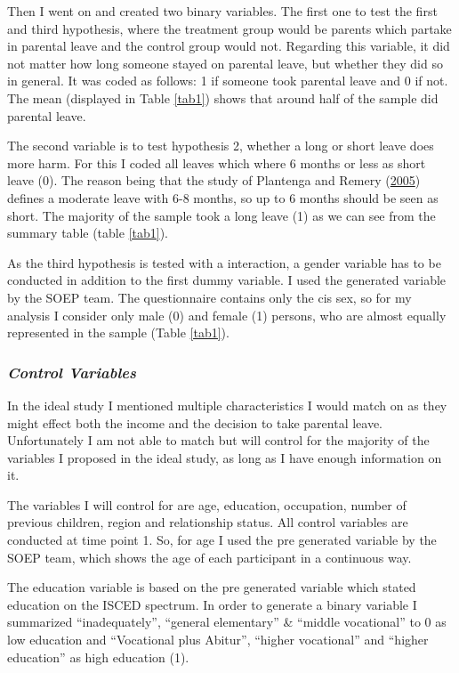 \documentclass[
  12pt,
]{article}
\begin{document}
Then I went on and created two binary variables. The first one to test the first and third hypothesis, where the treatment group would be parents which partake in parental leave and the control group would not. Regarding this variable, it did not matter how long someone stayed on parental leave, but whether they did so in general. It was coded as follows: 1 if someone took parental leave and 0 if not. The mean (displayed in Table \ref{tab1}) shows that around half of the sample did parental leave.

The second variable is to test hypothesis 2, whether a long or short leave does more harm. For this I coded all leaves which where 6 months or less as short leave (0). The reason being that the study of Plantenga and Remery (\protect\hyperlink{ref-plantenga_reconciliation_2005}{2005}) defines a moderate leave with 6-8 months, so up to 6 months should be seen as short. The majority of the sample took a long leave (1) as we can see from the summary table (table \ref{tab1}).

As the third hypothesis is tested with a interaction, a gender variable has to be conducted in addition to the first dummy variable. I used the generated variable by the SOEP team. The questionnaire contains only the cis sex, so for my analysis I consider only male (0) and female (1) persons, who are almost equally represented in the sample (Table \ref{tab1}).

\hypertarget{control-variables}{%
\subsubsection*{\texorpdfstring{\emph{Control Variables}}{Control Variables}}\label{control-variables}}

In the ideal study I mentioned multiple characteristics I would match on as they might effect both the income and the decision to take parental leave. Unfortunately I am not able to match but will control for the majority of the variables I proposed in the ideal study, as long as I have enough information on it.

The variables I will control for are age, education, occupation, number of previous children, region and relationship status. All control variables are conducted at time point 1.
So, for age I used the pre generated variable by the SOEP team, which shows the age of each participant in a continuous way.

The education variable is based on the pre generated variable which stated education on the ISCED spectrum. In order to generate a binary variable I summarized ``inadequately'', ``general elementary'' \& ``middle vocational'' to 0 as low education and ``Vocational plus Abitur'', ``higher vocational'' and ``higher education'' as high education (1).
\end{document}
